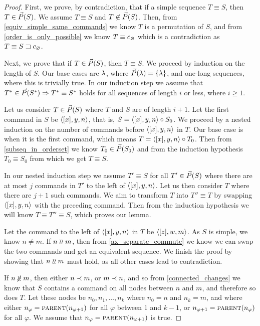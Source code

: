 \begin{proof}
First, we prove, by contradiction, that if a simple sequence $T\equiv S$, then $T\in\vec{P}({S})$.
We assume $T\equiv S$ and $T\not\in\vec{P}({S})$.
Then, from \cref{equiv_simple_same_commands} we know $T$ is a permutation of $S$,
and from \cref{order_is_only_possible} we know $T\equiv c_\varnothing$ which
is a contradiction as $T\equiv {S}\sqsupset c_\varnothing$.

Next, we prove that if $T\in\vec{P}({S})$, then $T\equiv S$.
We proceed by induction on the length of $S$.
Our base cases are $\lambda$, where $\vec{P}({\lambda})=\{\lambda\}$,
and one-long sequences, where this is trivially true.
In our induction step we assume that $T^*\in\vec{P}({S^*})\Rightarrow T^*\equiv S^*$ holds
for all sequences of length $i$ or less, where $i\geq 1$.

Let us consider $T\in\vec{P}({S})$ where $T$ and $S$ are of length $i+1$.
Let the first command in $S$ be $\langle{[x],y,n}\rangle$, that is, $S=\langle{[x],y,n}\rangle\circ S_0$.
We proceed by a nested induction on the number of commands before $\langle{[x],y,n}\rangle$ in $T$.
Our base case is when it is the first command, which means $T=\langle{[x],y,n}\rangle\circ T_0$.
Then from \cref{subseq_in_orderset} we know $T_0\in\vec{P}({S_0})$
and from the induction hypothesis $T_0\equiv S_0$ from which we get $T\equiv S$.

In our nested induction step we assume $T'\equiv S$ for all $T'\in\vec{P}({S})$
where there are at most $j$ commands in $T'$ to the left of $\langle{[x],y,n}\rangle$.
Let us then consider $T$ where there are $j+1$ such commands.
We aim to transform $T$ into $T''\equiv T$ by swapping $\langle{[x],y,n}\rangle$ with the preceding
command. Then from the induction hypothesis we will know $T\equiv T''\equiv S$,
which proves our lemma.

Let the command to the left of $\langle{[x],y,n}\rangle$ in $T$ be $\langle{[z],w,m}\rangle$.
As $S$ is simple, we know $n\neq m$.
If $n\mathrel{\wr\wr} m$, then from \cref{ax_separate_commute} we know we can swap the two commands
and get an equivalent sequence.
We finish the proof by showing that $n\mathrel{\wr\wr} m$ must hold, as
all other cases lead to contradiction.

\newcommand{\indx}{\varphi}
If $n\nunrel m$, then either $n\prec m$, or $m\prec n$, and so from
\cref{connected_changes} we know that $S$ contains a command on all nodes
between $n$ and $m$, and therefore so does $T$.
Let these nodes be $n_0, n_1, \ldots, n_k$ where $n_0=n$ and $n_k=m$,
and where 
either $n_\indx=\parentf{n_{\indx+1}}$ for all $\indx$ between $1$ and $k-1$,
or $n_{\indx+1}=\parentf{n_\indx}$ for all $\indx$.
We assume that $n_\indx=\parentf{n_{\indx+1}}$ is true.


\end{proof}

